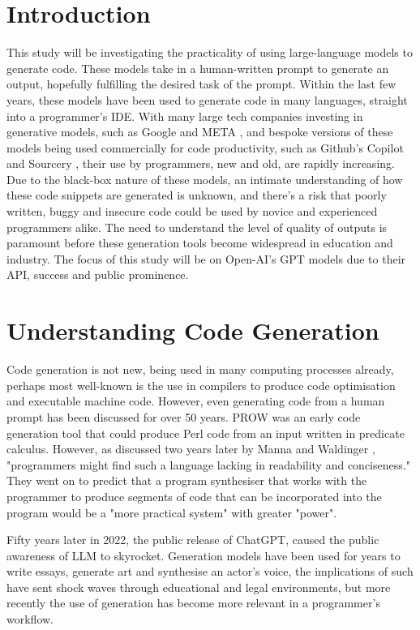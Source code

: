 \documentclass[manuscript,screen,review,sigconf]{acmart}
\begin{document}
\section{Introduction}
This study will be investigating the practicality of using large-language models to generate code. These models take in a human-written prompt to generate an output, hopefully fulfilling the desired task of the prompt. Within the last few years, these models have been used to generate code in many languages, straight into a programmer's IDE. With many large tech companies investing in generative models, such as Google and META \cite{Google_AI_2023, Meta_2023}, and bespoke versions of these models being used commercially for code productivity, such as Github's Copilot and Sourcery \cite{GitHub_2021, Sourcery_2023}, their use by programmers, new and old, are rapidly increasing. Due to the black-box nature of these models, an intimate understanding of how these code snippets are generated is unknown, and there's a risk that poorly written, buggy and insecure code could be used by novice and experienced programmers alike. The need to understand the level of quality of outputs is paramount before these generation tools become widespread in education and industry. The focus of this study will be on Open-AI's GPT models due to their API, success and public prominence.

\section{Understanding Code Generation}
Code generation is not new, being used in many computing processes already, perhaps most well-known is the use in compilers to produce code optimisation and executable machine code. However, even generating code from a human prompt has been discussed for over 50 years. PROW \cite{PROW} was an early code generation tool that could produce Perl code from an input written in predicate calculus. However, as discussed two years later by Manna and Waldinger \cite{Program_Syn}, "programmers might find such a language lacking in readability and conciseness." They went on to predict that a program synthesiser that works with the programmer to produce segments of code that can be incorporated into the program would be a "more practical system" with greater "power".

Fifty years later in 2022, the public release of ChatGPT\cite{ChatRel}, caused the public awareness of LLM  to skyrocket. Generation models have been used for years to write essays, generate art and synthesise an actor's voice, the implications of such have sent shock waves through educational and legal environments, but more recently the use of generation has become more relevant in a programmer's workflow.
\end{document}
